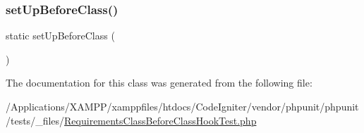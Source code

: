 \subsubsection{\texorpdfstring{set\+Up\+Before\+Class()}{setUpBeforeClass()}}
{\footnotesize\ttfamily static set\+Up\+Before\+Class (\begin{DoxyParamCaption}{ }\end{DoxyParamCaption})\hspace{0.3cm}{\ttfamily [static]}}



The documentation for this class was generated from the following file\+:\begin{DoxyCompactItemize}
\item 
/\+Applications/\+X\+A\+M\+P\+P/xamppfiles/htdocs/\+Code\+Igniter/vendor/phpunit/phpunit/tests/\+\_\+files/\mbox{\hyperlink{_requirements_class_before_class_hook_test_8php}{Requirements\+Class\+Before\+Class\+Hook\+Test.\+php}}\end{DoxyCompactItemize}
